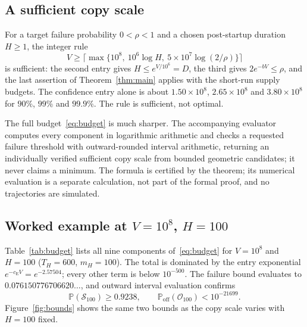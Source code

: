 \documentclass[11pt,a4paper]{article}
\theoremstyle{plain}
\theoremstyle{definition}
\theoremstyle{remark}
\newcommand{\Prob}{\mathbb P}
\newcommand{\cE}{c_{\mathrm E}}
\newcommand{\Son}{\mathcal S}
\newcommand{\Ooff}{\mathcal O}
\newcommand{\Poff}{\Prob_{\mathrm{off}}}
\begin{document}
\subsection{A sufficient copy scale}
For a target failure probability $0<\rho<1$ and a chosen post-startup duration $H\ge1$, the integer rule
\begin{equation}\label{eq:sizing}
 V\ge\Big\lceil\max\big\{10^8,\ 10^6\log H,\ 5\times10^7\log(2/\rho)\big\}\Big\rceil
\end{equation}
is sufficient: the second entry gives $H\le e^{V/10^6}=D$, the third gives $2e^{-bV}\le\rho$, and the last assertion of Theorem~\ref{thm:main} applies with the short-run supply budgets. The confidence entry alone is about $1.50\times10^8$, $2.65\times10^8$ and $3.80\times10^8$ for $90\%$, $99\%$ and $99.9\%$. The rule is sufficient, not optimal.

The full budget~\eqref{eq:budget} is much sharper. The accompanying evaluator computes every component in logarithmic arithmetic and checks a requested failure threshold with outward-rounded interval arithmetic, returning an individually verified sufficient copy scale from bounded geometric candidates; it never claims a minimum. The formula is certified by the theorem; its numerical evaluation is a separate calculation, not part of the formal proof, and no trajectories are simulated.

\subsection{Worked example at \texorpdfstring{$V=10^8$, $H=100$}{V = 1e8, H = 100}}
Table~\ref{tab:budget} lists all nine components of~\eqref{eq:budget} for $V=10^8$ and $H=100$ ($T_H=600$, $m_H=100$). The total is dominated by the entry exponential $e^{-\cE V}=e^{-2.57504}$; every other term is below $10^{-500}$. The failure bound evaluates to $0.076150776706620\ldots$, and outward interval evaluation confirms
\begin{equation}\label{eq:exampleprob}
 \Prob(\Son_{100})\ge0.9238,\qquad\Poff(\Ooff_{100})<10^{-21699}.
\end{equation}
Figure~\ref{fig:bounds} shows the same two bounds as the copy scale varies with $H=100$ fixed.
\end{document}
